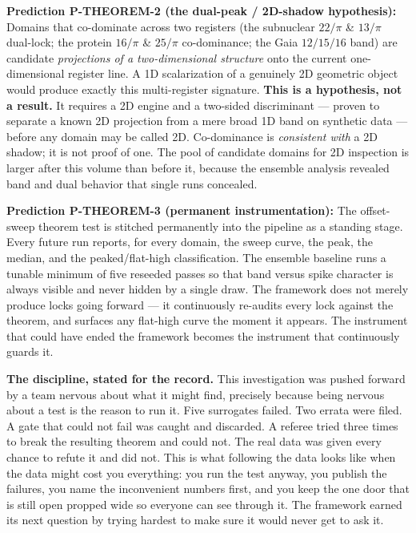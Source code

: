 \documentclass[11pt, letterpaper, openany]{book}
\begin{document}
\begin{empiricalbox}
\begin{predictionbox}
\textbf{Prediction P-THEOREM-2 (the dual-peak / 2D-shadow hypothesis):}
Domains that co-dominate across two registers (the subnuclear $22/\pi$ \& $13/\pi$
dual-lock; the protein $16/\pi$ \& $25/\pi$ co-dominance; the Gaia $12/15/16$ band)
are candidate \emph{projections of a two-dimensional structure} onto the current
one-dimensional register line. A 1D scalarization of a genuinely 2D geometric object
would produce exactly this multi-register signature. \textbf{This is a hypothesis,
not a result.} It requires a 2D engine and a two-sided discriminant --- proven to
separate a known 2D projection from a mere broad 1D band on synthetic data --- before
any domain may be called 2D. Co-dominance is \emph{consistent with} a 2D shadow; it is
not proof of one. The pool of candidate domains for 2D inspection is larger after this
volume than before it, because the ensemble analysis revealed band and dual behavior
that single runs concealed.
\end{predictionbox}

\begin{predictionbox}
\textbf{Prediction P-THEOREM-3 (permanent instrumentation):}
The offset-sweep theorem test is stitched permanently into the pipeline as a standing
stage. Every future run reports, for every domain, the sweep curve, the peak, the
median, and the peaked/flat-high classification. The ensemble baseline runs a tunable
minimum of five reseeded passes so that band versus spike character is always visible
and never hidden by a single draw. The framework does not merely produce locks going
forward --- it continuously re-audits every lock against the theorem, and surfaces any
flat-high curve the moment it appears. The instrument that could have ended the
framework becomes the instrument that continuously guards it.
\end{predictionbox}

\begin{empiricalbox}
\textbf{The discipline, stated for the record.} This investigation was pushed forward
by a team nervous about what it might find, precisely because being nervous about a
test is the reason to run it. Five surrogates failed. Two errata were filed. A gate
that could not fail was caught and discarded. A referee tried three times to break the
resulting theorem and could not. The real data was given every chance to refute it and
did not. This is what following the data looks like when the data might cost you
everything: you run the test anyway, you publish the failures, you name the
inconvenient numbers first, and you keep the one door that is still open propped wide
so everyone can see through it. The framework earned its next question by trying
hardest to make sure it would never get to ask it.
\end{empiricalbox}
\clearpage


\end{empiricalbox}
\end{document}
